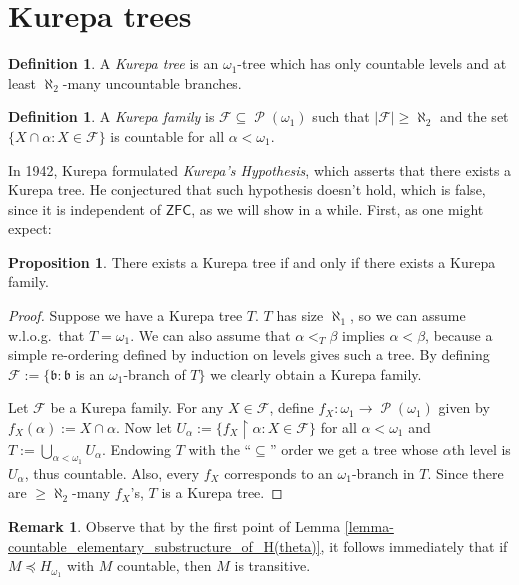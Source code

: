 \documentclass[12pt,a4paper]{report}
\theoremstyle{definition}
\newtheorem{proposition}[theorem]{Proposition}
\newtheorem{defn}[theorem]{Definition}
\newtheorem*{remark}{Remark}
\theoremstyle{num.custom-title}
\DeclareMathOperator{\PP}{\mathcal{P}}
\DeclareMathOperator{\sse}{\subseteq}
\DeclareMathOperator{\restr}{\upharpoonright}
\newcommand{\ZFC}{\ensuremath{\mathsf{ZFC}}\xspace}
\newcommand{\F}{\mathcal{F}}
\begin{document}
\section{Kurepa trees}

\begin{defn}
A \emph{Kurepa tree} is an $\omega_1$-tree which has only countable levels and at least $\aleph_2$-many uncountable branches.
\end{defn}

\begin{defn}
A \emph{Kurepa family} is $\F \sse \PP(\omega_1)$ such that $|\F| \geq \aleph_2$ and the set $\{X \cap \alpha : X \in \F\}$ is countable for all $\alpha < \omega_1$.
\end{defn}

In 1942, Kurepa formulated \emph{Kurepa's Hypothesis}, which asserts that there exists a Kurepa tree. He conjectured that such hypothesis doesn't hold, which is false, since it is independent of \ZFC, as we will show in a while. First, as one might expect:

\begin{proposition}
There exists a Kurepa tree if and only if there exists a Kurepa family.
\begin{proof}
Suppose we have a Kurepa tree $T$. $T$ has size $\aleph_1$, so we can assume w.l.o.g.\ that $T = \omega_1$. We can also assume that $\alpha <_T \beta$ implies $\alpha < \beta$, because a simple re-ordering defined by induction on levels gives such a tree. By defining $\F := \{ \mathfrak{b} : \mathfrak{b}$ is an $\omega_1$-branch of $T \}$ we clearly obtain a Kurepa family.

Let $\F$ be a Kurepa family. For any $X \in \F$, define $f_X \colon \omega_1 \to \PP(\omega_1)$ given by $f_X(\alpha) := X \cap \alpha$. Now let $U_\alpha := \{ f_X \restr \alpha : X \in \F \}$ for all $\alpha < \omega_1$ and $T := \bigcup_{\alpha < \omega_1} U_\alpha$. Endowing $T$ with the ``$\sse$'' order we get a tree whose $\alpha$th level is $U_\alpha$, thus countable. Also, every $f_X$ corresponds to an $\omega_1$-branch in $T$. Since there are $\geq \aleph_2$-many $f_X$'s, $T$ is a Kurepa tree.
\end{proof}
\end{proposition}

\begin{remark}
Observe that by the first point of Lemma \ref{lemma-countable_elementary_substructure_of_H(theta)}, it follows immediately that if $M \preceq H_{\omega_1}$ with $M$ countable, then $M$ is transitive.
\end{remark}
\end{document}
